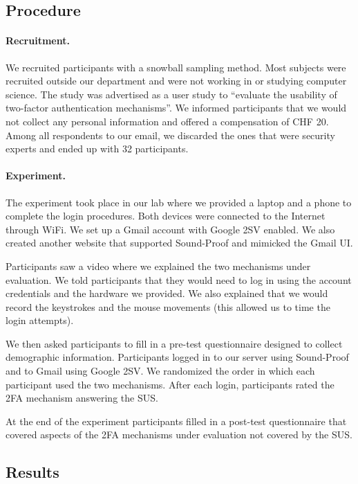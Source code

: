 \subsection{Procedure}

\paragraph{Recruitment.}
We recruited participants with a snowball sampling method. Most subjects were recruited outside our department and were not working in or studying computer science.
The study was advertised as a user study to ``evaluate the usability of two-factor authentication mechanisms''.
We informed participants that we would not collect any personal information and offered a compensation of CHF 20.
Among all respondents to our email, we discarded the ones that were security experts and ended up with 32 participants.

\paragraph{Experiment.}
The experiment took place in our lab where we provided a laptop and a phone to complete the login procedures. Both devices were connected to the Internet through WiFi.
We set up a Gmail account with Google 2SV enabled.
We also created another website that supported Sound-Proof and mimicked the Gmail UI.

Participants saw a video where we explained the two mechanisms under evaluation.
We told participants that they would need to log in using the account credentials and the hardware we provided.
We also explained that we would record the keystrokes and the mouse movements (this allowed us to time the login attempts).

We then asked participants to fill in a pre-test questionnaire designed to collect demographic information.
Participants logged in to our server using Sound-Proof and to Gmail using Google 2SV.
We randomized the order in which each participant used the two mechanisms.
After each login, participants rated the 2FA mechanism answering the SUS.

At the end of the experiment participants filled in a post-test questionnaire that
covered aspects of the 2FA mechanisms under evaluation not covered by the SUS.

\subsection{Results}

